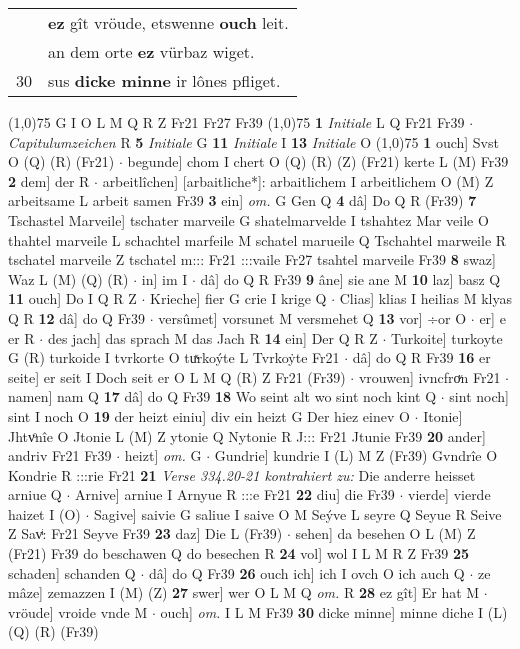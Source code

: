 \documentclass[8pt,a4paper,notitlepage]{article}
\begin{document}
\begin{table}[ht]
\begin{minipage}[t]{0.5\linewidth}
\begin{tabular}{rl}
 & \textbf{ez} gît vröude, etswenne \textbf{ouch} leit.\\ 
 & an dem orte \textbf{ez} vürbaz wiget.\\ 
30 & sus \textbf{dicke minne} ir lônes pfliget.\\ 
\end{tabular}
\scriptsize
\line(1,0){75} \newline
G I O L M Q R Z Fr21 Fr27 Fr39 \newline
\line(1,0){75} \newline
\textbf{1} \textit{Initiale} L Q Fr21 Fr39   $\cdot$ \textit{Capitulumzeichen} R  \textbf{5} \textit{Initiale} G  \textbf{11} \textit{Initiale} I  \textbf{13} \textit{Initiale} O  \newline
\line(1,0){75} \newline
\textbf{1} ouch] Svst O (Q) (R) (Fr21)  $\cdot$ begunde] chom I chert O (Q) (R) (Z) (Fr21) kerte L (M) Fr39 \textbf{2} dem] der R  $\cdot$ arbeitlîchen] [arbaitliche*]: arbaitlichem I arbeitlichem O (M) Z arbeitsame L arbeit samen Fr39 \textbf{3} ein] \textit{om.} G Gen Q \textbf{4} dâ] Do Q R (Fr39) \textbf{7} Tschastel Marveile] tschater marveile G shatelmarvelde I tshahtez Mar veile O thahtel marveile L schachtel marfeile M schatel marueile Q Tschahtel marweile R tschatel marveile Z tschatel m::: Fr21 :::vaile Fr27 tsahtel marveile Fr39 \textbf{8} swaz] Waz L (M) (Q) (R)  $\cdot$ in] im I  $\cdot$ dâ] do Q R Fr39 \textbf{9} âne] sie ane M \textbf{10} laz] basz Q \textbf{11} ouch] Do I Q R Z  $\cdot$ Krieche] fier G crie I krige Q  $\cdot$ Clias] klias I heilias M klyas Q R \textbf{12} dâ] do Q Fr39  $\cdot$ versûmet] vorsunet M versmehet Q \textbf{13} vor] ÷or O  $\cdot$ er] e er R  $\cdot$ des jach] das sprach M das Jach R \textbf{14} ein] Der Q R Z  $\cdot$ Turkoite] turkoyte G (R) turkoide I tvrkorte O tuͯrkoýte L Tvrkoẏte Fr21  $\cdot$ dâ] do Q R Fr39 \textbf{16} er seite] er seit I Doch seit er O L M Q (R) Z Fr21 (Fr39)  $\cdot$ vrouwen] ivncfroͮn Fr21  $\cdot$ namen] nam Q \textbf{17} dâ] do Q Fr39 \textbf{18} Wo seint alt wo sint noch kint Q  $\cdot$ sint noch] sint I noch O \textbf{19} der heizt einiu] div ein heizt G Der hiez einev O  $\cdot$ Itonie] Jhtvͦnîe O Jtonie L (M) Z ytonie Q Nytonie R J::: Fr21 Jtunie Fr39 \textbf{20} ander] andriv Fr21 Fr39  $\cdot$ heizt] \textit{om.} G  $\cdot$ Gundrie] kundrie I (L) M Z (Fr39) Gvndrîe O Kondrie R :::rie Fr21 \textbf{21} \textit{Verse 334.20-21 kontrahiert zu:} Die anderre heisset arniue Q   $\cdot$ Arnive] arniue I Arnyue R :::e Fr21 \textbf{22} diu] die Fr39  $\cdot$ vierde] vierde haizet I (O)  $\cdot$ Sagive] saivie G saliue I saive O M Seýve L seyre Q Seyue R Seive Z Savͥ: Fr21 Seyve Fr39 \textbf{23} daz] Die L (Fr39)  $\cdot$ sehen] da besehen O L (M) Z (Fr21) Fr39 do beschawen Q do besechen R \textbf{24} vol] wol I L M R Z Fr39 \textbf{25} schaden] schanden Q  $\cdot$ dâ] do Q Fr39 \textbf{26} ouch ich] ich I ovch O ich auch Q  $\cdot$ ze mâze] zemazzen I (M) (Z) \textbf{27} swer] wer O L M Q \textit{om.} R \textbf{28} ez gît] Er hat M  $\cdot$ vröude] vroide vnde M  $\cdot$ ouch] \textit{om.} I L M Fr39 \textbf{30} dicke minne] minne diche I (L) (Q) (R) (Fr39) \newline

\end{minipage}
\end{table}
\end{document}
